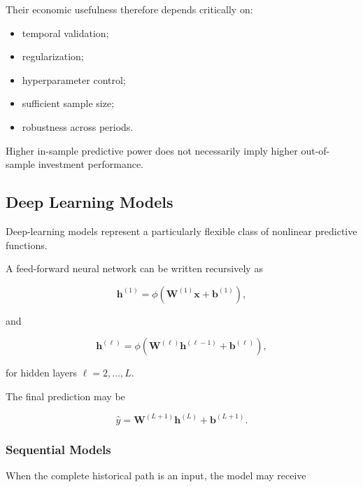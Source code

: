 \documentclass[11pt,a4paper]{article}
\begin{document}
Their economic usefulness therefore depends critically on:

\begin{itemize}
    \item temporal validation;
    \item regularization;
    \item hyperparameter control;
    \item sufficient sample size;
    \item robustness across periods.
\end{itemize}

Higher in-sample predictive power does not necessarily imply higher
out-of-sample investment performance.


\subsection{Deep Learning Models}
\label{subsec:deep_learning_models}

Deep-learning models represent a particularly flexible class of nonlinear
predictive functions.

A feed-forward neural network can be written recursively as

\begin{equation}
\mathbf{h}^{(1)}
=
\phi
\left(
\mathbf{W}^{(1)}\mathbf{x}
+
\mathbf{b}^{(1)}
\right),
\end{equation}

and

\begin{equation}
\mathbf{h}^{(\ell)}
=
\phi
\left(
\mathbf{W}^{(\ell)}
\mathbf{h}^{(\ell-1)}
+
\mathbf{b}^{(\ell)}
\right),
\end{equation}

for hidden layers $\ell=2,\ldots,L$.

The final prediction may be

\begin{equation}
\boxed{
\widehat{y}
=
\mathbf{W}^{(L+1)}
\mathbf{h}^{(L)}
+
\mathbf{b}^{(L+1)}.
}
\end{equation}


\subsubsection{Sequential Models}

When the complete historical path is an input, the model may receive
\end{document}

